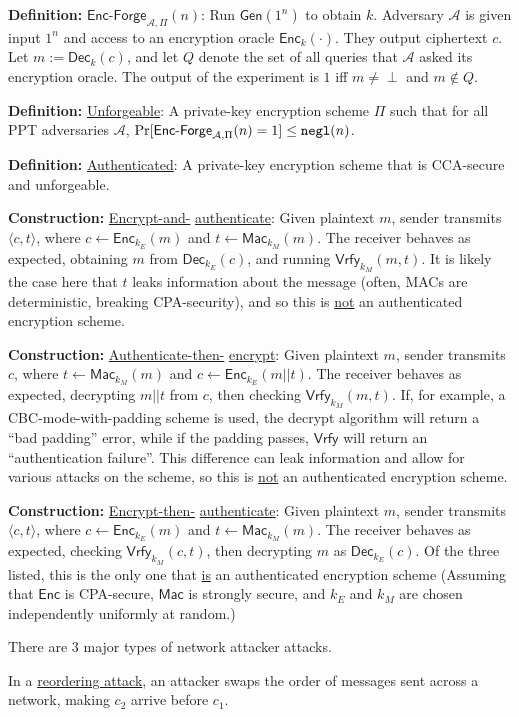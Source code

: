 \documentclass[10pt]{article}
\newcommand{\AAA}{\mathcal{A}}
\newcommand{\defn}[1]{{\bf Definition:} \underline{#1}}
\newcommand{\con}[1]{{\bf Construction:} \underline{#1}}
\newcommand{\Enc}{\mathsf{Enc}}
\newcommand{\Dec}{\mathsf{Dec}}
\newcommand{\Mac}{\mathsf{Mac}}
\newcommand{\Vrfy}{\mathsf{Vrfy}}
\newcommand{\Gen}{\mathsf{Gen}}
\newcommand{\ang}[1]{\langle#1\rangle}
\newcommand{\ExptEncfArgs}[2]{\mathsf{Enc\text{-}Forge}_{#1,#2}}
\newcommand{\ExptEncf}{\ExptEncfArgs{\AAA}{\Pi}}
\newcommand{\negl}{{\tt negl}}
\newcommand{\from}{\leftarrow}
\begin{document}
\scriptsize
\begin{multicols}{4}

\defn{$\ExptEncf(n)$}: Run $\Gen(1^n)$ to obtain $k$. Adversary $\AAA$ is given input $1^n$ and access to an encryption oracle $\Enc_k(\cdot)$. They output ciphertext $c$. Let $m:=\Dec_k(c)$, and let $Q$ denote the set of all queries that $\AAA$ asked its encryption oracle. The output of the experiment is $1$ iff $m\neq\perp$ and $m\not\in Q$.

\defn{Unforgeable}: A private-key encryption scheme $\Pi$ such that for all PPT adversaries $\AAA$, $\Pr[\ExptEncf(n)=1]\leq\negl(n)$.

\defn{Authenticated}: A private-key encryption scheme that is CCA-secure and unforgeable.

\con{Encrypt-and-} \underline{authenticate}: Given plaintext $m$, sender transmits $\ang{c,t}$, where $c\from\Enc_{k_E}(m)$ and $t\from\Mac_{k_M}(m)$. The receiver behaves as expected, obtaining $m$ from $\Dec_{k_E}(c)$, and running $\Vrfy_{k_M}(m,t)$. It is likely the case here that $t$ leaks information about the message (often, MACs are deterministic, breaking CPA-security), and so this is \underline{not} an authenticated encryption scheme.

\con{Authenticate-then-} \underline{encrypt}: Given plaintext $m$, sender transmits $c$, where $t\from\Mac_{k_M}(m)$ and $c\from\Enc_{k_E}(m||t)$. The receiver behaves as expected, decrypting $m||t$ from $c$, then checking $\Vrfy_{k_M}(m,t)$. If, for example, a CBC-mode-with-padding scheme is used, the decrypt algorithm will return a ``bad padding'' error, while if the padding passes, $\Vrfy$ will return an ``authentication failure''. This difference can leak information and allow for various attacks on the scheme, so this is \underline{not} an authenticated encryption scheme.

\con{Encrypt-then-} \underline{authenticate}: Given plaintext $m$, sender transmits $\ang{c,t}$, where $c\from\Enc_{k_E}(m)$ and $t\from\Mac_{k_M}(m)$. The receiver behaves as expected, checking $\Vrfy_{k_M}(c,t)$, then decrypting $m$ as $\Dec_{k_E}(c)$. Of the three listed, this is the only one that \underline{is} an authenticated encryption scheme (Assuming that $\Enc$ is CPA-secure, $\Mac$ is strongly secure, and $k_E$ and $k_M$ are chosen independently uniformly at random.)

There are 3 major types of network attacker attacks.

In a \underline{reordering attack}, an attacker swaps the order of messages sent across a network, making $c_2$ arrive before $c_1$.


\end{multicols}
\end{document}
